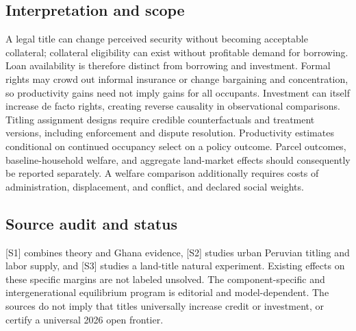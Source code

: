 \documentclass[11pt,a4paper]{article}
\begin{document}
\subsection*{Interpretation and scope}
A legal title can change perceived security without becoming acceptable collateral; collateral eligibility can exist without profitable demand for borrowing. Loan availability is therefore distinct from borrowing and investment. Formal rights may crowd out informal insurance or change bargaining and concentration, so productivity gains need not imply gains for all occupants. Investment can itself increase de facto rights, creating reverse causality in observational comparisons. Titling assignment designs require credible counterfactuals and treatment versions, including enforcement and dispute resolution. Productivity estimates conditional on continued occupancy select on a policy outcome. Parcel outcomes, baseline-household welfare, and aggregate land-market effects should consequently be reported separately. A welfare comparison additionally requires costs of administration, displacement, and conflict, and declared social weights.
\subsection*{Source audit and status}
[S1] combines theory and Ghana evidence, [S2] studies urban Peruvian titling and labor supply, and [S3] studies a land-title natural experiment. Existing effects on these specific margins are not labeled unsolved. The component-specific and intergenerational equilibrium program is editorial and model-dependent. The sources do not imply that titles universally increase credit or investment, or certify a universal 2026 open frontier.
\end{document}
